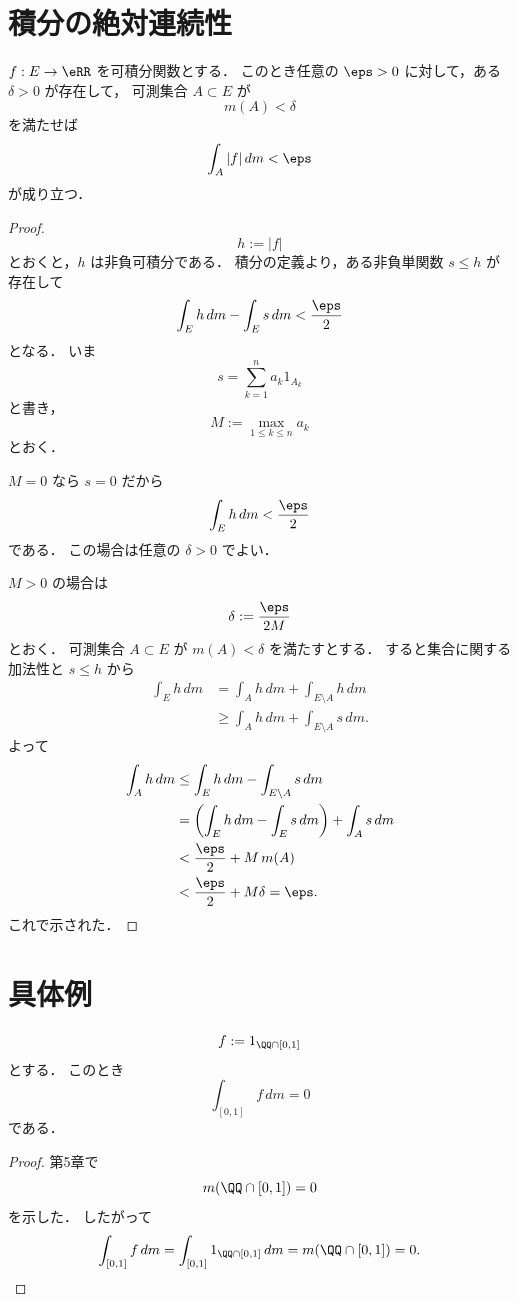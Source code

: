 \section{積分の絶対連続性}

\begin{theorem}[積分の絶対連続性]
$f:E \to \eRR$ を可積分関数とする．
このとき任意の $\eps>0$ に対して，ある $\delta>0$ が存在して，
可測集合 $A \subset E$ が
\[
m(A)<\delta
\]
を満たせば
\[
\int_A |f|\,dm<\eps
\]
が成り立つ．
\end{theorem}
\begin{proof}
\[
h:=|f|
\]
とおくと，$h$ は非負可積分である．
積分の定義より，ある非負単関数 $s \le h$ が存在して
\[
\int_E h\,dm-\int_E s\,dm<\frac{\eps}{2}
\]
となる．
いま
\[
s=\sum_{k=1}^n a_k1_{A_k}
\]
と書き，
\[
M:=\max_{1\le k\le n}a_k
\]
とおく．

$M=0$ なら $s=0$ だから
\[
\int_E h\,dm<\frac{\eps}{2}
\]
である．
この場合は任意の $\delta>0$ でよい．

$M>0$ の場合は
\[
\delta:=\frac{\eps}{2M}
\]
とおく．
可測集合 $A \subset E$ が $m(A)<\delta$ を満たすとする．
すると集合に関する加法性と $s\le h$ から
\begin{align*}
\int_E h\,dm
&=
\int_A h\,dm+\int_{E\setminus A}h\,dm \\
&\ge
\int_A h\,dm+\int_{E\setminus A}s\,dm.
\end{align*}
よって
\begin{align*}
\int_A h\,dm
&\le
\int_E h\,dm-\int_{E\setminus A}s\,dm \\
&=
\left(\int_E h\,dm-\int_E s\,dm\right)+\int_A s\,dm \\
&<
\frac{\eps}{2}+M\,m(A) \\
&<
\frac{\eps}{2}+M\delta=\eps.
\end{align*}
これで示された．
\end{proof}

\section{具体例}

\begin{example}[Dirichlet関数]
\[
f:=1_{\QQ \cap [0,1]}
\]
とする．
このとき
\[
\int_{[0,1]} f\,dm=0
\]
である．
\end{example}
\begin{proof}
第5章で
\[
m(\QQ \cap [0,1])=0
\]
を示した．
したがって
\[
\int_{[0,1]} f\,dm
=
\int_{[0,1]} 1_{\QQ \cap [0,1]}\,dm
=
m(\QQ \cap [0,1])
=
0.
\]
\end{proof}

